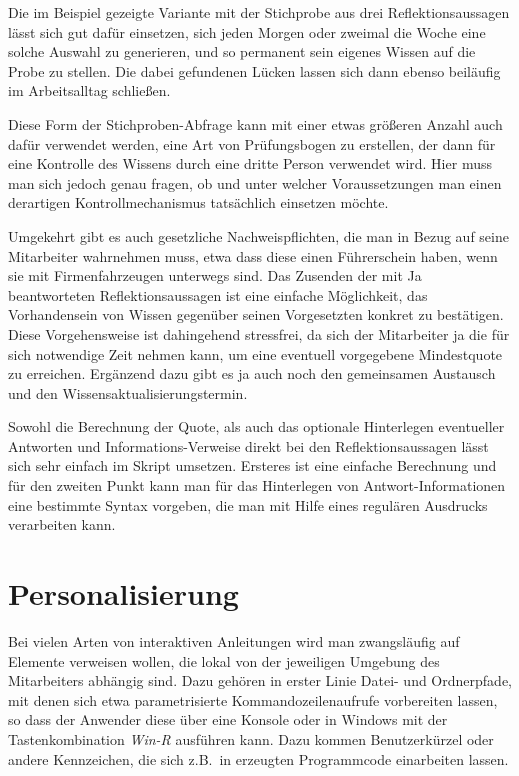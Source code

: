 Die im Beispiel gezeigte Variante mit der Stichprobe aus drei Reflektionsaussagen lässt sich gut dafür einsetzen, sich jeden Morgen oder zweimal die Woche eine solche Auswahl zu generieren, und so permanent sein eigenes Wissen auf die Probe zu stellen. Die dabei gefundenen Lücken lassen sich dann ebenso beiläufig im Arbeitsalltag schließen.

Diese Form der Stichproben-Abfrage kann mit einer etwas größeren Anzahl auch dafür verwendet werden, eine Art von Prüfungsbogen zu erstellen, der dann für eine Kontrolle des Wissens durch eine dritte Person verwendet wird. Hier muss man sich jedoch genau fragen, ob und unter welcher Voraussetzungen man einen derartigen Kontrollmechanismus tatsächlich einsetzen möchte.

Umgekehrt gibt es auch gesetzliche Nachweispflichten, die man in Bezug auf seine Mitarbeiter wahrnehmen muss, etwa dass diese einen Führerschein haben, wenn sie mit Firmenfahrzeugen unterwegs sind. Das Zusenden der mit Ja beantworteten Reflektionsaussagen ist eine einfache Möglichkeit, das Vorhandensein von Wissen gegenüber seinen Vorgesetzten konkret zu bestätigen. Diese Vorgehensweise ist dahingehend stressfrei, da sich der Mitarbeiter ja die für sich notwendige Zeit nehmen kann, um eine eventuell vorgegebene Mindestquote zu erreichen. Ergänzend dazu gibt es ja auch noch den gemeinsamen Austausch und den Wissensaktualisierungstermin.

Sowohl die Berechnung der Quote, als auch das optionale Hinterlegen eventueller Antworten und Informations-Verweise direkt bei den Reflektionsaussagen lässt sich sehr einfach im Skript umsetzen. Ersteres ist eine einfache Berechnung und für den zweiten Punkt kann man für das Hinterlegen von Antwort-Informationen eine bestimmte Syntax vorgeben, die man mit Hilfe eines regulären Ausdrucks verarbeiten kann.

\section{Personalisierung}\label{Personalisierung}
Bei vielen Arten von interaktiven Anleitungen wird man zwangsläufig auf Elemente verweisen wollen, die lokal von der jeweiligen Umgebung des Mitarbeiters abhängig sind. Dazu gehören in erster Linie Datei- und Ordnerpfade, mit denen sich etwa parametrisierte Kommandozeilenaufrufe vorbereiten lassen, so dass der Anwender diese über eine Konsole oder in Windows mit der Tastenkombination \emph{Win-R} ausführen kann. Dazu kommen Benutzerkürzel oder andere Kennzeichen, die sich z.B.\ in erzeugten Programmcode einarbeiten lassen. 


